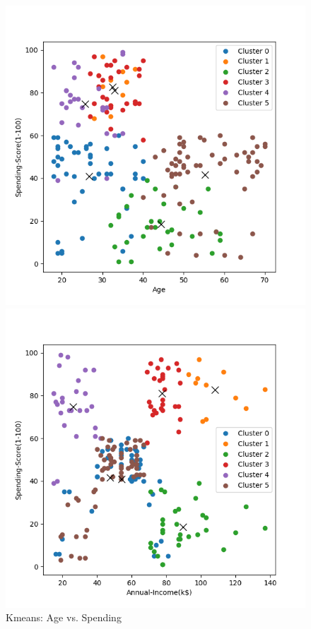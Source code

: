 \documentclass[8pt]{article}
\begin{document}
\begin{figure}[H]
\begin{minipage}{0.32\textwidth}
        \includegraphics[width=\textwidth]{./Prob4/out/task1_rand14/images/cluster_result_k6_0_2.png}
        \caption{Kmeans: Age vs. Spending}
        \label{fig: Age vs. Spending Score k6 rand14 com}
    \end{minipage}
    \hfill
    \begin{minipage}{0.32\textwidth}
        \centering
        \includegraphics[width=\textwidth]{./Prob4/out/task1_rand14/images/cluster_result_k6_1_2.png}

\end{minipage}
\end{figure}
\end{document}
